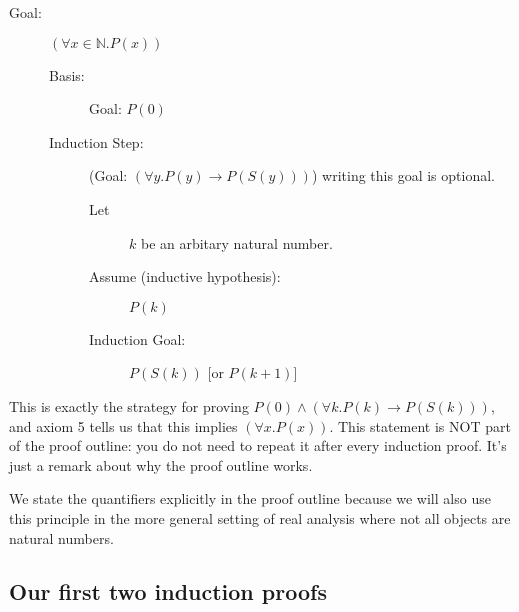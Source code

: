 \documentclass[12pt]{article}
\begin{document}
\begin{description}

\item[Goal:]  $(\forall x \in {\mathbb N}.P(x))$

\begin{description}

\item[Basis:]  Goal:  $P(0)$

\item[Induction Step:]  (Goal:  $(\forall y.P(y) \rightarrow P(S(y)))$) writing this goal is optional.

\begin{description}

\item[Let]  $k$ be an arbitary natural number.

\item[Assume (inductive hypothesis):]  $P(k)$

\item[Induction Goal:]  $P(S(k))$ [or $P(k+1)$]

\end{description}

\end{description}

\end{description}

This is exactly the strategy for proving $P(0) \wedge (\forall k.P(k)
\rightarrow P(S(k)))$, and axiom 5 tells us that this implies $(\forall
x.P(x))$.  This statement is NOT part of the proof outline: you do not
need to repeat it after every induction proof.  It's just a remark
about why the proof outline works.

We state the quantifiers explicitly in the proof outline because we
will also use this principle in the more general setting of real
analysis where not all objects are natural numbers.

\subsection{Our first two induction proofs}
\end{document}

